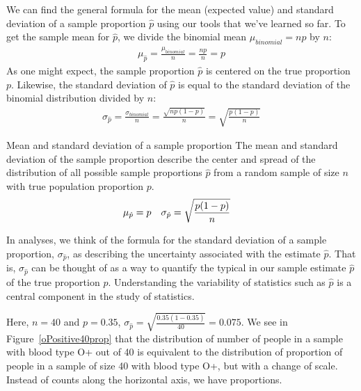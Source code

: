 We can find the general formula for the mean (expected value) and standard deviation of a sample proportion $\hat{p}$ using our tools that we've learned so far. To get the sample mean for $\hat{p}$, we divide the binomial mean $\mu_{binomial} = np$ by $n$:
\begin{align*}
\mu_{\hat{p}} = \frac{\mu_{binomial}}{n} = \frac{np}{n} = p
\end{align*}
As one might expect, the sample proportion $\hat{p}$ is centered on the true proportion $p$. Likewise, the standard deviation of $\hat{p}$ is equal to the standard deviation of the binomial distribution divided by $n$:
\begin{align*}
\sigma_{\hat{p}}
	= \frac{\sigma_{binomial}}{n}
	= \frac{\sqrt{np(1-p)}}{n}
	= \sqrt{\frac{p(1-p)}{n}}
\end{align*}

\begin{onebox}{Mean and standard deviation of a sample proportion}
The mean and standard deviation of the sample proportion describe the center and spread of the distribution of all possible sample proportions $\hat{p}$ from a random sample of size $n$ with true population proportion $p$.
\begin{align*}
\mu_{\hat{p}} &= p
	& \sigma_{\hat{p}}&= \sqrt{\frac{p(1-p)}{n}}
	\vspace{1mm}
\end{align*}\end{onebox}


In analyses, we think of the formula for the standard deviation of a sample proportion, $\sigma_{\hat{p}}$, as describing the uncertainty associated with the estimate $\hat{p}$. That is, $\sigma_{\hat{p}}$ can be thought of as a way to quantify the typical  in our sample estimate $\hat{p}$ of the true proportion $p$. Understanding the variability of statistics such as $\hat{p}$ is a central component in the study of statistics.

Here, $n=40$ and $p=0.35$, $\sigma_{\hat{p}} = \sqrt{\frac{0.35(1-0.35)}{40}}=0.075$.
We see in Figure~\ref{oPositive40prop} that the distribution of number of people in a sample with blood type O+ out of 40 is equivalent to the distribution of proportion of people in a sample of size 40 with blood type O+, but with a change of scale.
Instead of counts along the horizontal axis, we have proportions.  

